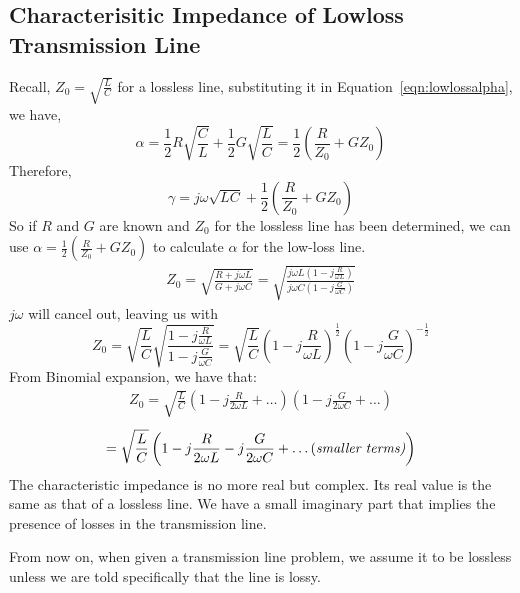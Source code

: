 \subsection{Characterisitic Impedance of Lowloss Transmission Line}
Recall, $Z_0 = \sqrt{\frac{L}{C}}$ for a lossless line, substituting it in Equation~\eqref{eqn:lowlossalpha}, we have,
\[\alpha = \frac{1}{2}R\sqrt{\frac{C}{L}} + \frac{1}{2}G\sqrt{\frac{L}{C}} = \frac{1}{2}\left(\frac{R}{Z_0} + GZ_0\right)\]
Therefore,
\[\gamma = j\omega\sqrt{LC} + \frac{1}{2}\left(\frac{R}{Z_0} + GZ_0\right)\]
So if $R$ and $G$ are known and $Z_0$ for the lossless line has been determined, we can use $\alpha = \frac{1}{2}(\frac{R}{Z_0} + GZ_0)$ to calculate $\alpha$ for the low-loss line.
\begin{align*}
Z_0 = \sqrt{\frac{R + j\omega L}{G + j\omega C}} = \sqrt{\frac{j\omega L(1 - j\frac{R}{\omega L})}{j\omega C(1 - j\frac{G}{\omega C})}}
\end{align*}
$j\omega$ will cancel out, leaving us with
\begin{dmath*}
Z_0 = \sqrt{\frac{L}{C}}\sqrt{\frac{1 - j\frac{R}{\omega L}}{1 - j\frac{G}{\omega C}}} =\sqrt{\frac{L}{C}}\left(1 - j\frac{R}{\omega L}\right)^{\frac{1}{2}}\left(1 - j\frac{G}{\omega C}\right)^{-\frac{1}{2}} 
\end{dmath*}
From Binomial expansion, we have that:
\begin{align*}
Z_0 = \sqrt{\frac{L}{C}}\left(1 - j\frac{R}{2\omega L} + \ldots\right)\left(1 - j\frac{G}{2\omega C} + \ldots\right)
\end{align*}
\begin{align*}
= \sqrt{\frac{L}{C}}\left(1 - j\frac{R}{2\omega L} - j\frac{G}{2\omega C} + \text{\ldots (\it{smaller terms})}\right)
\end{align*}
The characteristic impedance is no more real but complex. Its real value is the same as that of a lossless line. We have a small imaginary part that implies the presence of losses in the transmission line.

From now on, when given a transmission line problem, we assume it to be lossless unless we are told specifically that the line is lossy.


